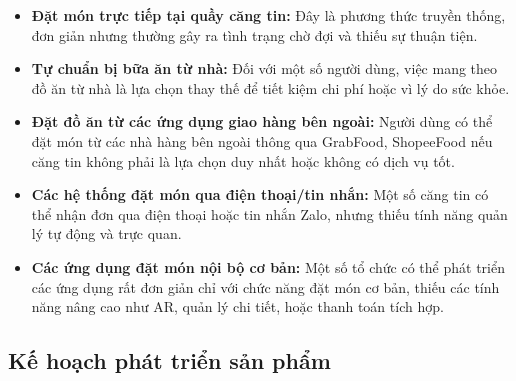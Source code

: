 \documentclass[12pt,a4paper]{article}
\begin{document}
\begin{itemize}[label=\textbullet]
    \item \textbf{Đặt món trực tiếp tại quầy căng tin:} Đây là phương thức truyền thống, đơn giản nhưng thường gây ra tình trạng chờ đợi và thiếu sự thuận tiện.
    \item \textbf{Tự chuẩn bị bữa ăn từ nhà:} Đối với một số người dùng, việc mang theo đồ ăn từ nhà là lựa chọn thay thế để tiết kiệm chi phí hoặc vì lý do sức khỏe.
    \item \textbf{Đặt đồ ăn từ các ứng dụng giao hàng bên ngoài:} Người dùng có thể đặt món từ các nhà hàng bên ngoài thông qua GrabFood, ShopeeFood nếu căng tin không phải là lựa chọn duy nhất hoặc không có dịch vụ tốt.
    \item \textbf{Các hệ thống đặt món qua điện thoại/tin nhắn:} Một số căng tin có thể nhận đơn qua điện thoại hoặc tin nhắn Zalo, nhưng thiếu tính năng quản lý tự động và trực quan.
    \item \textbf{Các ứng dụng đặt món nội bộ cơ bản:} Một số tổ chức có thể phát triển các ứng dụng rất đơn giản chỉ với chức năng đặt món cơ bản, thiếu các tính năng nâng cao như AR, quản lý chi tiết, hoặc thanh toán tích hợp.
\end{itemize}

\subsection{Kế hoạch phát triển sản phẩm}
\end{document}

